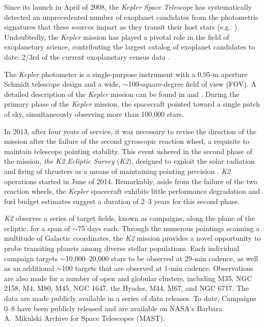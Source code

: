 \documentclass[apjl]{emulateapj}
\begin{document}
Since its launch in April of 2008, the \textit{Kepler Space Telescope}
has systematically detected an unprecedented number of exoplanet
candidates from the photometric signatures that these sources impart as
they transit their host stars (e.g.\ \citet{Mullally:2015}).
Undoubtedly, the \textit{Kepler} mission has played a pivotal role in
the field of exoplanetary science, contributing the largest catalog of
exoplanet candidates to date: 2/3rd of the current exoplanetary
census data \citep{Morton2016}.

The \textit{Kepler} photometer is a single-purpose instrument with a
0.95-m aperture Schmidt telescope design and a wide,
$\sim$100-square-degree field of view (FOV).  A detailed description of
the \textit{Kepler} mission can be found in \citet{Borucki:2010} and
\citet{Koch:2010}. During the primary phase of the \textit{Kepler}
mission, the spacecraft pointed toward a single patch of sky,
simultaneously observing more than 100,000 stars.

In 2013, after four years of service, it was necessary to revise the
direction of the mission after the failure of the second gyroscopic
reaction wheel, a requisite to maintain telescope pointing stability.
This event ushered in the second phase of the mission, \textit{the K2
  Ecliptic Survey} (\textit{K2}), designed to exploit the solar
radiation and firing of thrusters as a means of maintaining pointing
precision \citep{Howell:2014}.  \textit{K2} operations started in June
of 2014.  Remarkably, aside from the failure of the two reaction wheels,
the \textit{Kepler} spacecraft exhibits little performance degradation
and fuel budget estimates suggest a duration of 2--3 years for this
second phase.

\textit{K2} observes a series of target fields, known as campaigns,
along the plane of the ecliptic, for a span of $\sim$75 days each.
Through the numerous pointings scanning a multitude of Galactic
coordinates, the \textit{K2} mission provides a novel opportunity to
probe transiting planets among diverse stellar populations.  Each
individual campaign targets $\sim$10,000--20,000 stars to be observed at
29-min cadence, as well as an additional $\sim$100 targets that are
observed at 1-min cadence.  Observations are also made for a number of
open and globular clusters, including M35, NGC 2158, M4, M80, M45, NGC
1647, the Hyades, M44, M67, and NGC 6717.  The data are made publicly
available in a series of data releases. To date, Campaigns 0--8 have
been publicly released and are available on NASA's Barbara A.~Mikulski
Archive for Space Telescopes (MAST).
\end{document}
